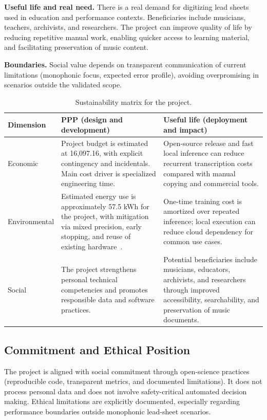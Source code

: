 \documentclass[11pt, a4paper]{article}
\begin{document}
\textbf{Useful life and real need.} There is a real demand for digitizing lead sheets used in education and performance contexts. Beneficiaries include musicians, teachers, archivists, and researchers. The project can improve quality of life by reducing repetitive manual work, enabling quicker access to learning material, and facilitating preservation of music content.

\textbf{Boundaries.} Social value depends on transparent communication of current limitations (monophonic focus, expected error profile), avoiding overpromising in scenarios outside the validated scope.

\begin{table}[h!]
    \centering
    \caption{Sustainability matrix for the project.}
    \label{tab:sustainability-matrix}
    \renewcommand{\arraystretch}{1.2}
    \scriptsize
    \begin{tabularx}{\linewidth}{>{\raggedright}p{2.3cm} >{\raggedright\arraybackslash}X >{\raggedright\arraybackslash}X}
        \toprule
        \textbf{Dimension} & \textbf{PPP (design and development)} & \textbf{Useful life (deployment and impact)} \\
        \midrule
        Economic & Project budget is estimated at \EUR{}16,097.16, with explicit contingency and incidentals. Main cost driver is specialized engineering time. & Open-source release and fast local inference can reduce recurrent transcription costs compared with manual copying and commercial tools. \\
        Environmental & Estimated energy use is approximately 57.5 kWh for the project, with mitigation via mixed precision, early stopping, and reuse of existing hardware~\cite{reeInformeSistemaElectrico2024,mitecoFactorEmision2025}. & One-time training cost is amortized over repeated inference; local execution can reduce cloud dependency for common use cases. \\
        Social & The project strengthens personal technical competencies and promotes responsible data and software practices. & Potential beneficiaries include musicians, educators, archivists, and researchers through improved accessibility, searchability, and preservation of music documents. \\
        \bottomrule
    \end{tabularx}
\end{table}

\subsection{Commitment and Ethical Position}
The project is aligned with social commitment through open-science practices (reproducible code, transparent metrics, and documented limitations). It does not process personal data and does not involve safety-critical automated decision making. Ethical limitations are explicitly documented, especially regarding performance boundaries outside monophonic lead-sheet scenarios.

\newpage
\printbibliography[heading=bibintoc, title={References}]
\end{document}
